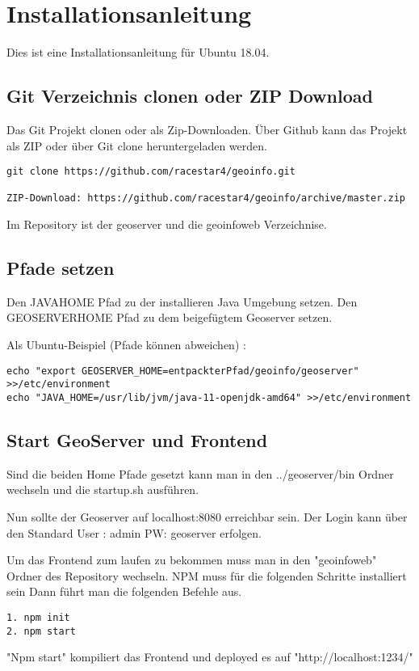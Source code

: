 \section{Installationsanleitung}
Dies ist eine Installationsanleitung für Ubuntu 18.04.
\subsection{Git Verzeichnis clonen oder ZIP Download}
Das Git Projekt clonen oder als Zip-Downloaden.
Über Github kann das Projekt als ZIP oder über Git clone heruntergeladen werden.

\begin{lstlisting}[frame=single,basicstyle=\small]
git clone https://github.com/racestar4/geoinfo.git

ZIP-Download: https://github.com/racestar4/geoinfo/archive/master.zip
\end{lstlisting}
Im Repository ist der geoserver und die geoinfoweb Verzeichnise. 

\subsection{Pfade setzen}
Den JAVAHOME Pfad zu der installieren Java Umgebung setzen.
Den GEOSERVERHOME Pfad zu dem beigefügtem Geoserver setzen.

Als Ubuntu-Beispiel (Pfade können abweichen) :
\begin{lstlisting}[frame=single,basicstyle=\small]
echo "export GEOSERVER_HOME=entpackterPfad/geoinfo/geoserver" >>/etc/environment
echo "JAVA_HOME=/usr/lib/jvm/java-11-openjdk-amd64" >>/etc/environment
\end{lstlisting}


\subsection{Start GeoServer und Frontend}
Sind die beiden Home Pfade gesetzt kann man in den ../geoserver/bin Ordner wechseln und die startup.sh ausführen.


Nun sollte der Geoserver auf localhost:8080 erreichbar sein.
Der Login kann über den Standard User : admin
PW: geoserver erfolgen.


Um das Frontend zum laufen zu bekommen muss man in den "geoinfoweb" Ordner des Repository wechseln.
 NPM muss für die folgenden Schritte installiert sein
Dann führt man die folgenden Befehle aus.
\begin{lstlisting}[frame=single,basicstyle=\small]
1. npm init
2. npm start
\end{lstlisting}
 "Npm start" kompiliert das Frontend und deployed es auf "http://localhost:1234/"
 
